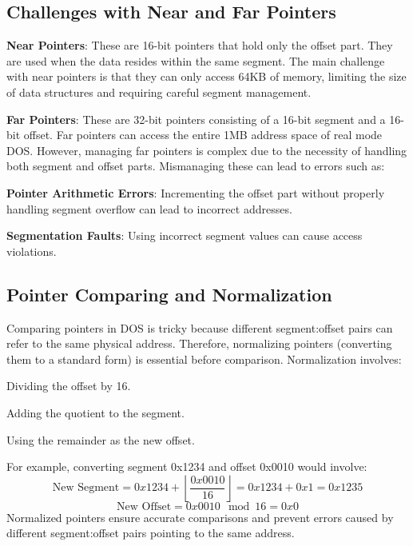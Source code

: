 \documentclass[a4paper]{article}
\begin{document}
\subsection*{Challenges with Near and Far Pointers}
\begin{itemize}
  \begin{item}
    \textbf{Near Pointers}: These are 16-bit pointers that hold only the offset part. They are used when the data resides within the same segment. The main challenge with near pointers is that they can only access 64KB of memory, limiting the size of data structures and requiring careful segment management.
  \end{item}
  \begin{item}
    \textbf{Far Pointers}: These are 32-bit pointers consisting of a 16-bit segment and a 16-bit offset. Far pointers can access the entire 1MB address space of real mode DOS. However, managing far pointers is complex due to the necessity of handling both segment and offset parts. Mismanaging these can lead to errors such as:
    \begin{itemize}
      \begin{item}
        \textbf{Pointer Arithmetic Errors}: Incrementing the offset part without properly handling segment overflow can lead to incorrect addresses.
      \end{item}
      \begin{item}
        \textbf{Segmentation Faults}: Using incorrect segment values can cause access violations.
      \end{item}
    \end{itemize}
  \end{item}
\end{itemize}
\subsection*{Pointer Comparing and Normalization}
Comparing pointers in DOS is tricky because different segment:offset pairs can refer to the same physical address. Therefore, normalizing pointers (converting them to a standard form) is essential before comparison. Normalization involves:

\begin{enumerate}
  \begin{item}
    Dividing the offset by 16.
  \end{item}
  \begin{item}
    Adding the quotient to the segment.
  \end{item}
  \begin{item}
    Using the remainder as the new offset.
  \end{item}
\end{enumerate}
For example, converting segment 0x1234 and offset 0x0010 would involve:
\[
\text{New Segment} = 0x1234 + \left\lfloor \frac{0x0010}{16} \right\rfloor = 0x1234 + 0x1 = 0x1235
\]
\[
\text{New Offset} = 0x0010 \mod 16 = 0x0
\]
Normalized pointers ensure accurate comparisons and prevent errors caused by different segment:offset pairs pointing to the same address.
\end{document}
